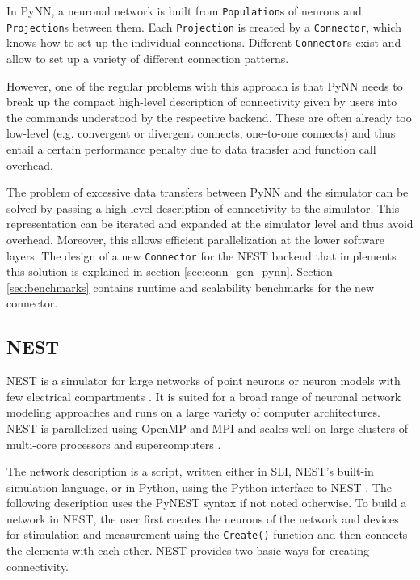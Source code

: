 \documentclass{frontiersSCNS} %
\begin{document}
In PyNN, a neuronal network is built from \verb|Population|s of
neurons and \verb|Projection|s between them. Each \verb|Projection| is
created by a \verb|Connector|, which knows how to set up the individual
connections. Different \verb|Connector|s exist and allow to set up a variety
of different connection patterns.

However, one of the regular problems with this approach is that PyNN
needs to break up the compact high-level description of connectivity
given by users into the commands understood by the respective
backend. These are often already too low-level (e.g. convergent or
divergent connects, one-to-one connects) and thus entail a certain
performance penalty due to data transfer and function call overhead.

The problem of excessive data transfers between PyNN and the simulator
can be solved by passing a high-level description of connectivity to
the simulator. This representation can be iterated and expanded at the
simulator level and thus avoid overhead. Moreover, this allows
efficient parallelization at the lower software layers.  The design of
a new \verb|Connector| for the NEST backend that implements this
solution is explained in section \ref{sec:conn_gen_pynn}. Section
\ref{sec:benchmarks} contains runtime and scalability benchmarks for
the new connector.

\subsection{NEST}

NEST is a simulator for large networks of point neurons or neuron
models with few electrical compartments
\citep[\url{http://www.nest-initiative.org};][]{Gewaltig_07_11204}. It
is suited for a broad range of neuronal network modeling approaches
and runs on a large variety of computer architectures. NEST is
parallelized using OpenMP \citep{OpenMPSpec} and MPI
\citep{MPIForum94} and scales well on large clusters of multi-core
processors and supercomputers \citep{Helias12_26}.

The network description is a script, written either in SLI, NEST's
built-in simulation language, or in Python, using the Python interface
to NEST \citep[PyNEST;][]{Eppler09_12}. The following description uses
the PyNEST syntax if not noted otherwise. To build a network in NEST,
the user first creates the neurons of the network and devices for
stimulation and measurement using the \verb|Create()| function and
then connects the elements with each other. NEST provides two basic
ways for creating connectivity.
\end{document}
